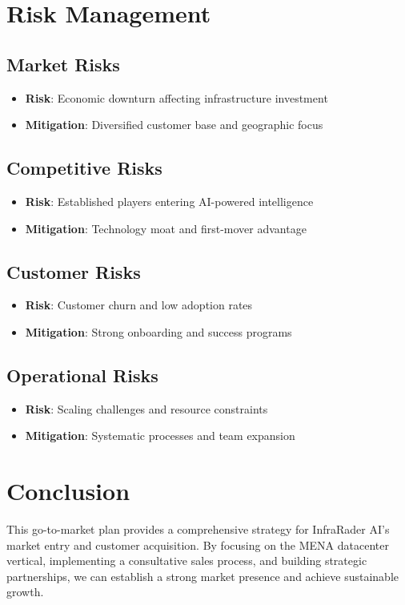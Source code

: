 \documentclass[business]{../templates/infraradar-main}
\begin{document}
\section{Risk Management}

\subsection{Market Risks}
\begin{itemize}
    \item \textbf{Risk}: Economic downturn affecting infrastructure investment
    \item \textbf{Mitigation}: Diversified customer base and geographic focus
\end{itemize}

\subsection{Competitive Risks}
\begin{itemize}
    \item \textbf{Risk}: Established players entering AI-powered intelligence
    \item \textbf{Mitigation}: Technology moat and first-mover advantage
\end{itemize}

\subsection{Customer Risks}
\begin{itemize}
    \item \textbf{Risk}: Customer churn and low adoption rates
    \item \textbf{Mitigation}: Strong onboarding and success programs
\end{itemize}

\subsection{Operational Risks}
\begin{itemize}
    \item \textbf{Risk}: Scaling challenges and resource constraints
    \item \textbf{Mitigation}: Systematic processes and team expansion
\end{itemize}

\section{Conclusion}

This go-to-market plan provides a comprehensive strategy for InfraRader AI's market entry and customer acquisition. By focusing on the MENA datacenter vertical, implementing a consultative sales process, and building strategic partnerships, we can establish a strong market presence and achieve sustainable growth.
\end{document}
